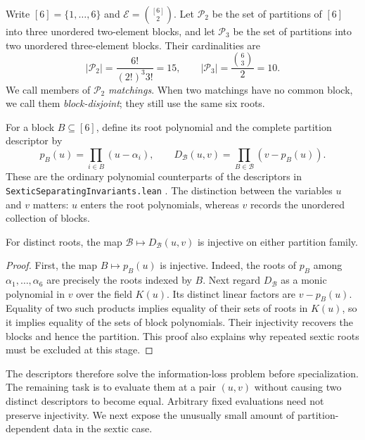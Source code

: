 \documentclass[11pt,letterpaper]{article}
\numberwithin{equation}{section}
\theoremstyle{definition}
\theoremstyle{remark}
\newcommand{\Ptwo}{\mathcal P_2}
\newcommand{\Pthree}{\mathcal P_3}
\newcommand{\Edges}{\mathcal E}
\newcommand{\src}[1]{\texttt{\nolinkurl{#1}}}
\begin{document}
Write $[6]=\{1,\ldots,6\}$ and
$\Edges=\binom{[6]}2$. Let $\Ptwo$ be the set of partitions of $[6]$ into
three unordered two-element blocks, and let $\Pthree$ be the set of
partitions into two unordered three-element blocks. Their cardinalities are
\begin{equation}
 |\Ptwo|=\frac{6!}{(2!)^3 3!}=15,
 \qquad |\Pthree|=\frac{\binom63}{2}=10.
\end{equation}
We call members of $\Ptwo$ \emph{matchings}. When two matchings have no common
block, we call them \emph{block-disjoint}; they still use the same six roots.

For a block $B\subseteq[6]$, define its root polynomial and the complete
partition descriptor by
\begin{equation}
 p_B(u)=\prod_{i\in B}(u-\alpha_i),
 \qquad D_{\mathcal B}(u,v)=\prod_{B\in\mathcal B}(v-p_B(u)).
 \label{sbr:eq:descriptor}
\end{equation}
These are the ordinary polynomial counterparts of the descriptors in
\src{SexticSeparatingInvariants.lean} \cite{repo-invariants}. The distinction
between the variables $u$ and $v$ matters: $u$ enters the root polynomials,
whereas $v$ records the unordered collection of blocks.

\begin{lemma}
\label{sbr:lem:complete}
For distinct roots, the map $\mathcal B\mapsto D_{\mathcal B}(u,v)$ is
injective on either partition family.
\end{lemma}
\begin{proof}
First, the map $B\mapsto p_B(u)$ is injective. Indeed, the roots of $p_B$
among $\alpha_1,\ldots,\alpha_6$ are precisely the roots indexed by $B$.
Next regard $D_{\mathcal B}$ as a monic polynomial in $v$ over the field
$K(u)$. Its distinct linear factors are $v-p_B(u)$. Equality of two such
products implies equality of their sets of roots in $K(u)$, so it implies
equality of the sets of block polynomials. Their injectivity recovers the
blocks and hence the partition. This proof also explains why repeated
sextic roots must be excluded at this stage.
\end{proof}

The descriptors therefore solve the information-loss problem before
specialization. The remaining task is to evaluate them at a pair $(u,v)$
without causing two distinct descriptors to become equal. Arbitrary fixed
evaluations need not preserve injectivity. We next expose the unusually
small amount of partition-dependent data in the sextic case.
\end{document}
